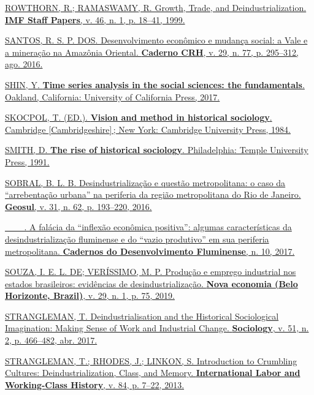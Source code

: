 {{\href{https://www.zotero.org/google-docs/?p3HTgZ}{ROWTHORN, R.;
RAMASWAMY, R. Growth, Trade, and Deindustrialization. \textbf{IMF Staff
Papers}, v. 46, n. 1, p. 18--41, 1999.}

\href{https://www.zotero.org/google-docs/?p3HTgZ}{SANTOS, R. S. P. DOS.
Desenvolvimento econômico e mudança social: a Vale e a mineração na
Amazônia Oriental. \textbf{Caderno CRH}, v. 29, n. 77, p. 295--312, ago.
2016.}

\href{https://www.zotero.org/google-docs/?p3HTgZ}{SHIN, Y. \textbf{Time
series analysis in the social sciences: the fundamentals}. Oakland,
California: University of California Press, 2017.}

\href{https://www.zotero.org/google-docs/?p3HTgZ}{SKOCPOL, T. (ED.).
\textbf{Vision and method in historical sociology}. Cambridge
{[}Cambridgeshire{]}\,; New York: Cambridge University Press, 1984.}

\href{https://www.zotero.org/google-docs/?p3HTgZ}{SMITH, D. \textbf{The
rise of historical sociology}. Philadelphia: Temple University Press,
1991.}

\href{https://www.zotero.org/google-docs/?p3HTgZ}{SOBRAL, B. L. B.
Desindustrialização e questão metropolitana: o caso da ``arrebentação
urbana'' na periferia da região metropolitana do Rio de Janeiro.
\textbf{Geosul}, v. 31, n. 62, p. 193--220, 2016.}

\href{https://www.zotero.org/google-docs/?p3HTgZ}{\_\_\_. A falácia da
``inflexão econômica positiva'': algumas características da
desindustrialização fluminense e do ``vazio produtivo'' em sua periferia
metropolitana. \textbf{Cadernos do Desenvolvimento Fluminense}, n. 10,
2017.}

\href{https://www.zotero.org/google-docs/?p3HTgZ}{SOUZA, I. E. L. DE;
VERÍSSIMO, M. P. Produção e emprego industrial nos estados brasileiros:
evidências de desindustrialização. \textbf{Nova economia (Belo
Horizonte, Brazil)}, v. 29, n. 1, p. 75, 2019.}

\href{https://www.zotero.org/google-docs/?p3HTgZ}{STRANGLEMAN, T.
Deindustrialisation and the Historical Sociological Imagination: Making
Sense of Work and Industrial Change. \textbf{Sociology}, v. 51, n. 2, p.
466--482, abr. 2017.}

\href{https://www.zotero.org/google-docs/?p3HTgZ}{STRANGLEMAN, T.;
RHODES, J.; LINKON, S. Introduction to Crumbling Cultures:
Deindustrialization, Class, and Memory. \textbf{International Labor and
Working-Class History}, v. 84, p. 7--22, 2013.}

}}
